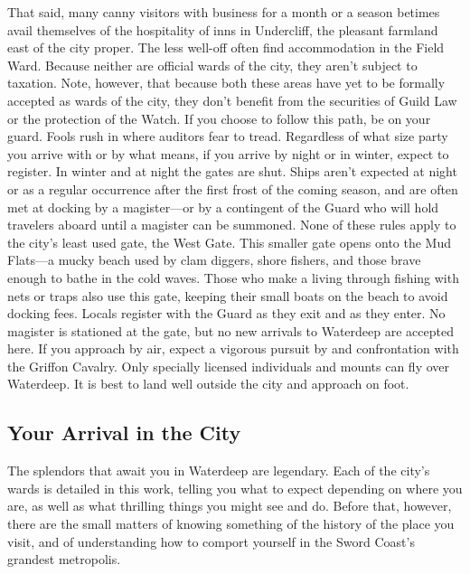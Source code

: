 \documentclass[10pt,a4paper,twoside,twocolumn,openany,nodeprecatedcode]{dndbook}
\begin{document}
That said, many canny visitors with business for a month or a season betimes avail themselves of the hospitality of inns in Undercliff, the pleasant farmland east of the city proper. The less well-off often find accommodation in the Field Ward. Because neither are official wards of the city, they aren't subject to taxation. Note, however, that because both these areas have yet to be formally accepted as wards of the city, they don't benefit from the securities of Guild Law or the protection of the Watch. If you choose to follow this path, be on your guard. Fools rush in where auditors fear to tread.
Regardless of what size party you arrive with or by what means, if you arrive by night or in winter, expect to register. In winter and at night the gates are shut. Ships aren't expected at night or as a regular occurrence after the first frost of the coming season, and are often met at docking by a magister—or by a contingent of the Guard who will hold travelers aboard until a magister can be summoned.
None of these rules apply to the city's least used gate, the West Gate. This smaller gate opens onto the Mud Flats—a mucky beach used by clam diggers, shore fishers, and those brave enough to bathe in the cold waves. Those who make a living through fishing with nets or traps also use this gate, keeping their small boats on the beach to avoid docking fees. Locals register with the Guard as they exit and as they enter. No magister is stationed at the gate, but no new arrivals to Waterdeep are accepted here.
If you approach by air, expect a vigorous pursuit by and confrontation with the Griffon Cavalry. Only specially licensed individuals and mounts can fly over Waterdeep. It is best to land well outside the city and approach on foot.
\subsection{Your Arrival in the City}
The splendors that await you in Waterdeep are legendary. Each of the city's wards is detailed in this work, telling you what to expect depending on where you are, as well as what thrilling things you might see and do. Before that, however, there are the small matters of knowing something of the history of the place you visit, and of understanding how to comport yourself in the Sword Coast's grandest metropolis.
\end{document}
